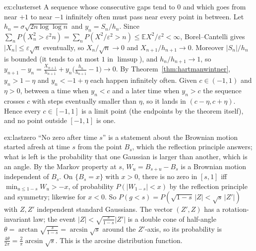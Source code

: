 \begin{solution}{ex:clusterset}
\idea A sequence whose consecutive gaps tend to $0$ and which goes from near $+1$ to near $-1$ infinitely often must pass near every point in between.
\writeup Let $h_n=\sigma\sqrt{2n\log\log n}$ and $y_n=S_n/h_n$. Since $\sum_nP(X_n^2>\varepsilon^2n)=\sum_nP(X^2/\varepsilon^2>n)\le\mathbb E X^2/\varepsilon^2<\infty$, Borel--Cantelli gives
$|X_n|\le\varepsilon\sqrt n$ eventually, so $X_n/\sqrt n\to0$ and $X_{n+1}/h_{n+1}\to0$. Moreover $|S_n|/h_n$ is bounded (it tends to at most $1$ in $\limsup$), and $h_n/h_{n+1}\to1$, so
$y_{n+1}-y_n=\frac{X_{n+1}}{h_{n+1}}+y_n\bigl(\frac{h_n}{h_{n+1}}-1\bigr)\to0$. By Theorem~\ref{thm:hartmanwintner}, $y_n>1-\eta$ and $y_n<-1+\eta$ each happen infinitely often. Given
$c\in(-1,1)$ and $\eta>0$, between a time when $y_n<c$ and a later time when $y_n>c$ the sequence crosses $c$ with steps eventually smaller than $\eta$, so it lands in $(c-\eta,c+\eta)$.
Hence every $c\in[-1,1]$ is a limit point (the endpoints by the theorem itself), and no point outside $[-1,1]$ is one.
\end{solution}

\begin{solution}{ex:lastzero}
\idea ``No zero after time $s$'' is a statement about the Brownian motion started afresh at time $s$ from the point $B_s$, which the reflection principle answers; what is left is
the probability that one Gaussian is larger than another, which is an angle.
\writeup By the Markov property at $s$, $W_u=B_{s+u}-B_s$ is a Brownian motion independent of $B_s$. On $\{B_s=x\}$ with $x>0$, there is no zero in $[s,1]$ iff $\min_{u\le1-s}W_u>-x$,
of probability $P(|W_{1-s}|<x)$ by the reflection principle and symmetry; likewise for $x<0$. So $P(g<s)=P(\sqrt{1-s}\,|Z|<\sqrt s\,|Z'|)$ with $Z,Z'$ independent standard
Gaussians. The vector $(Z',Z)$ has a rotation-invariant law; the event $|Z|<\sqrt{\frac s{1-s}}|Z'|$ is a double cone of half-angle $\theta=\arctan\sqrt{\frac s{1-s}}=\arcsin\sqrt s$ around the
$Z'$-axis, so its probability is $\frac{4\theta}{2\pi}=\frac2\pi\arcsin\sqrt s$. This is the arcsine distribution function.
\end{solution}

